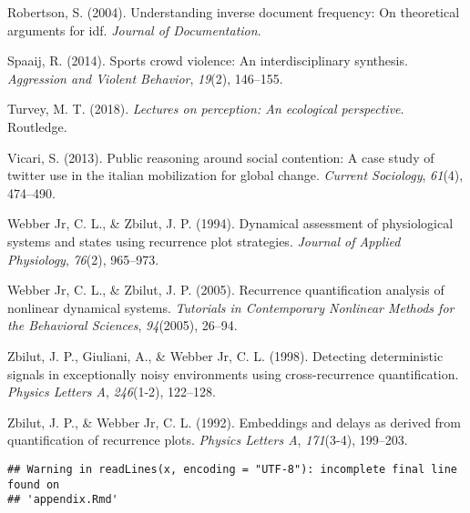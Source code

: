 \documentclass[english,man]{apa6}
\begin{document}
\leavevmode\hypertarget{ref-robertson2004understanding}{}%
Robertson, S. (2004). Understanding inverse document frequency: On theoretical arguments for idf. \emph{Journal of Documentation}.

\leavevmode\hypertarget{ref-spaaij2014sports}{}%
Spaaij, R. (2014). Sports crowd violence: An interdisciplinary synthesis. \emph{Aggression and Violent Behavior}, \emph{19}(2), 146--155.

\leavevmode\hypertarget{ref-turvey2018lectures}{}%
Turvey, M. T. (2018). \emph{Lectures on perception: An ecological perspective}. Routledge.

\leavevmode\hypertarget{ref-vicari2013public}{}%
Vicari, S. (2013). Public reasoning around social contention: A case study of twitter use in the italian mobilization for global change. \emph{Current Sociology}, \emph{61}(4), 474--490.

\leavevmode\hypertarget{ref-webber1994dynamical}{}%
Webber Jr, C. L., \& Zbilut, J. P. (1994). Dynamical assessment of physiological systems and states using recurrence plot strategies. \emph{Journal of Applied Physiology}, \emph{76}(2), 965--973.

\leavevmode\hypertarget{ref-webber2005recurrence}{}%
Webber Jr, C. L., \& Zbilut, J. P. (2005). Recurrence quantification analysis of nonlinear dynamical systems. \emph{Tutorials in Contemporary Nonlinear Methods for the Behavioral Sciences}, \emph{94}(2005), 26--94.

\leavevmode\hypertarget{ref-zbilut1998detecting}{}%
Zbilut, J. P., Giuliani, A., \& Webber Jr, C. L. (1998). Detecting deterministic signals in exceptionally noisy environments using cross-recurrence quantification. \emph{Physics Letters A}, \emph{246}(1-2), 122--128.

\leavevmode\hypertarget{ref-zbilut1992embeddings}{}%
Zbilut, J. P., \& Webber Jr, C. L. (1992). Embeddings and delays as derived from quantification of recurrence plots. \emph{Physics Letters A}, \emph{171}(3-4), 199--203.

\endgroup

\begin{verbatim}
## Warning in readLines(x, encoding = "UTF-8"): incomplete final line found on
## 'appendix.Rmd'
\end{verbatim}

\clearpage
\makeatletter
\efloat@restorefloats
\makeatother
\end{document}
